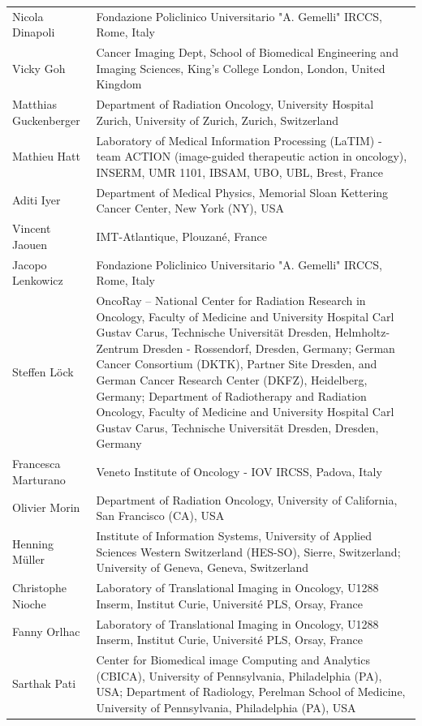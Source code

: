 \documentclass[fleqn,a4paper,oneside,openany]{book}
\begin{document}
\begin{longtable}{p{4cm}p{10cm}}
Nicola Dinapoli
& Fondazione Policlinico Universitario "A. Gemelli" IRCCS, Rome, Italy\\ 
Vicky Goh
& Cancer Imaging Dept, School of Biomedical Engineering and Imaging Sciences, King’s College London, London, United Kingdom\\ 
Matthias Guckenberger
& Department of Radiation Oncology, University Hospital Zurich, University of Zurich, Zurich, Switzerland\\ 
Mathieu Hatt
& Laboratory of Medical Information Processing (LaTIM) - team ACTION (image-guided therapeutic action in oncology), INSERM, UMR 1101, IBSAM, UBO, UBL, Brest, France\\ 
Aditi Iyer
& Department of Medical Physics, Memorial Sloan Kettering Cancer Center, New York (NY), USA\\ 
Vincent Jaouen
& IMT-Atlantique, Plouzané, France\\ 
Jacopo Lenkowicz
& Fondazione Policlinico Universitario "A. Gemelli" IRCCS, Rome, Italy\\ 
Steffen L{\"o}ck
& OncoRay – National Center for Radiation Research in Oncology, Faculty of Medicine and University Hospital Carl Gustav Carus, Technische Universität Dresden, Helmholtz-Zentrum Dresden - Rossendorf, Dresden, Germany; German Cancer Consortium (DKTK), Partner Site Dresden, and German Cancer Research Center (DKFZ), Heidelberg, Germany; Department of Radiotherapy and Radiation Oncology, Faculty of Medicine and University Hospital Carl Gustav Carus, Technische Universität Dresden, Dresden, Germany\\ 
Francesca Marturano & Veneto Institute of Oncology - IOV IRCSS, Padova, Italy\\
Olivier Morin
& Department of Radiation Oncology, University of California, San Francisco (CA), USA\\ 
Henning Müller
& Institute of Information Systems, University of Applied Sciences Western Switzerland (HES-SO), Sierre, Switzerland; University of Geneva, Geneva, Switzerland\\ 
Christophe Nioche
& Laboratory of Translational Imaging in Oncology, U1288 Inserm, Institut Curie, Université PLS, Orsay, France \\ 
Fanny Orlhac
& Laboratory of Translational Imaging in Oncology, U1288 Inserm, Institut Curie, Université PLS, Orsay, France \\ 
Sarthak Pati
& Center for Biomedical image Computing and Analytics (CBICA), University of Pennsylvania, Philadelphia (PA), USA; Department of Radiology, Perelman School of Medicine, University of Pennsylvania, Philadelphia (PA), USA\\ 

\end{longtable}
\end{document}
